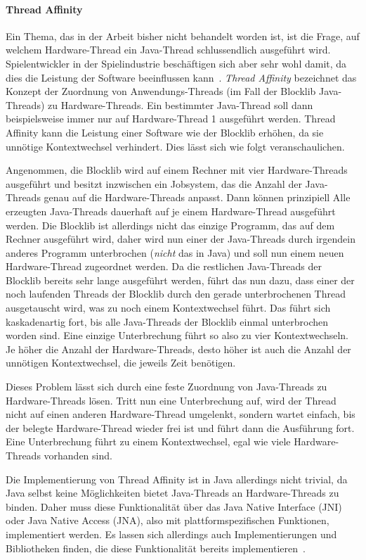\paragraph{Thread Affinity}
Ein Thema, das in der Arbeit bisher nicht behandelt worden ist, ist die Frage, auf welchem Hardware-Thread ein Java-Thread schlussendlich ausgeführt wird. Spielentwickler in der Spielindustrie beschäftigen sich aber sehr wohl damit, da dies die Leistung der Software beeinflussen kann~\cite{Gyrling2015}. \emph{Thread Affinity} bezeichnet das Konzept der Zuordnung von Anwendungs-Threads (im Fall der Blocklib Java-Threads) zu Hardware-Threads. Ein bestimmter Java-Thread soll dann beispielsweise immer nur auf Hardware-Thread 1 ausgeführt werden. Thread Affinity kann die Leistung einer Software wie der Blocklib erhöhen, da sie unnötige Kontextwechsel verhindert. Dies lässt sich wie folgt veranschaulichen.

Angenommen, die Blocklib wird auf einem Rechner mit vier Hardware-Threads ausgeführt und besitzt inzwischen ein Jobsystem, das die Anzahl der Java-Threads genau auf die Hardware-Threads anpasst. Dann können prinzipiell Alle erzeugten Java-Threads dauerhaft auf je einem Hardware-Thread ausgeführt werden. Die Blocklib ist allerdings nicht das einzige Programm, das auf dem Rechner ausgeführt wird, daher wird nun einer der Java-Threads durch irgendein anderes Programm unterbrochen (\emph{nicht} das  in Java) und soll nun einem neuen Hardware-Thread zugeordnet werden. Da die restlichen Java-Threads der Blocklib bereits sehr lange ausgeführt werden, führt das nun dazu, dass einer der noch laufenden Threads der Blocklib durch den gerade unterbrochenen Thread ausgetauscht wird, was zu noch einem Kontextwechsel führt. Das führt sich kaskadenartig fort, bis alle Java-Threads der Blocklib einmal unterbrochen worden sind. Eine einzige Unterbrechung führt so also zu vier Kontextwechseln. Je höher die Anzahl der Hardware-Threads, desto höher ist auch die Anzahl der unnötigen Kontextwechsel, die jeweils Zeit benötigen.

Dieses Problem lässt sich durch eine feste Zuordnung von Java-Threads zu Hardware-Threads lösen. Tritt nun eine Unterbrechung auf, wird der Thread nicht auf einen anderen Hardware-Thread umgelenkt, sondern wartet einfach, bis der belegte Hardware-Thread wieder frei ist und führt dann die Ausführung fort. Eine Unterbrechung führt zu einem Kontextwechsel, egal wie viele Hardware-Threads vorhanden sind.

Die Implementierung von Thread Affinity ist in Java allerdings nicht trivial, da Java selbst keine Möglichkeiten bietet Java-Threads an Hardware-Threads zu binden. Daher muss diese Funktionalität über das Java Native Interface (JNI) oder Java Native Access (JNA), also mit plattformspezifischen Funktionen, implementiert werden. Es lassen sich allerdings auch Implementierungen und Bibliotheken finden, die diese Funktionalität bereits implementieren~\cite{ChronicleSoftware,Cheremin2011}.